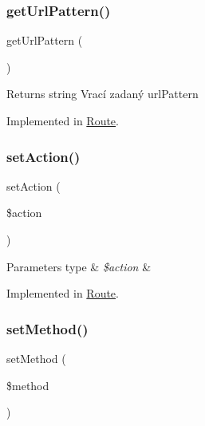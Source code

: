 \subsubsection{\texorpdfstring{get\+Url\+Pattern()}{getUrlPattern()}}
{\footnotesize\ttfamily get\+Url\+Pattern (\begin{DoxyParamCaption}{ }\end{DoxyParamCaption})}

\begin{DoxyReturn}{Returns}
string Vrací zadaný url\+Pattern 
\end{DoxyReturn}


Implemented in \mbox{\hyperlink{class_pes_1_1_router_1_1_route_af9358000c7c8783880577ca3751a6984}{Route}}.

\mbox{\label{interface_pes_1_1_router_1_1_route_interface_a0366b3b0db0bd90abfc461c372f86599}} 
\subsubsection{\texorpdfstring{set\+Action()}{setAction()}}
{\footnotesize\ttfamily set\+Action (\begin{DoxyParamCaption}\item[{}]{\$action }\end{DoxyParamCaption})}


\begin{DoxyParams}[1]{Parameters}
type & {\em \$action} & \\
\hline
\end{DoxyParams}


Implemented in \mbox{\hyperlink{class_pes_1_1_router_1_1_route_a0366b3b0db0bd90abfc461c372f86599}{Route}}.

\mbox{\label{interface_pes_1_1_router_1_1_route_interface_a643c65610f8b3179a8c147cab7cbb652}} 
\subsubsection{\texorpdfstring{set\+Method()}{setMethod()}}
{\footnotesize\ttfamily set\+Method (\begin{DoxyParamCaption}\item[{}]{\$method }\end{DoxyParamCaption})}


